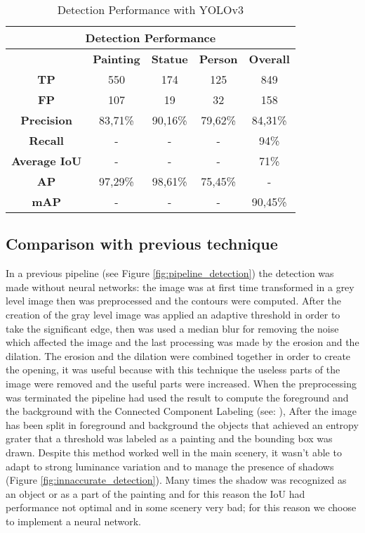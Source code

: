 \begin{table*}[ht]
    \centering
\begin{tabular}{|c|c|c|c|c|}
\hline
\multicolumn{5}{|c|}{\textbf{Detection Performance}}       \\ \hline
\multicolumn{1}{|l|}{} & \textbf{Painting} & \textbf{Statue} & \textbf{Person} & \textbf{Overall} \\ \hline
\textbf{TP}        & 550     & 174     & 125     & 849     \\ \hline
\textbf{FP}        & 107     & 19      & 32      & 158     \\ \hline
\textbf{Precision} & 83,71\% & 90,16\% & 79,62\% & 84,31\% \\ \hline
\textbf{Recall}    & -       & -       & -       & 94\%    \\ \hline
\textbf{Average IoU}       & -       & -       & -       & 71\%    \\ \hline
\textbf{AP}        & 97,29\% & 98,61\% & 75,45\% & -       \\ \hline
\textbf{mAP}       & -       & -       & -       & 90,45\% \\ \hline
\end{tabular}
\caption{Detection Performance with YOLOv3} 
    \label{tab:detection_performance}
\end{table*}



\subsection{Comparison with previous technique}
In a previous pipeline (see Figure \ref{fig:pipeline_detection}) the detection was made without neural networks: the image was at first time transformed in a grey level image then was preprocessed and the contours were computed. After the creation of the gray level image was applied an adaptive threshold in order to take the significant edge, then was used a median blur for removing the noise which affected the image and the last processing was made by the erosion and the dilation.
The erosion and the dilation were combined together in order to create the opening, it was useful because with this technique the useless parts of the image were removed and the useful parts were increased. 
When the preprocessing was terminated the pipeline had used the result to compute the foreground and the background with the Connected Component Labeling (see: \cite{Grana_ccl}),
After the image has been split in foreground and background the objects that achieved an entropy grater that a threshold was labeled as a painting and the bounding box was drawn.
Despite this method worked well in the main scenery, it wasn't able to adapt to strong luminance variation and to manage the presence of shadows (Figure \ref{fig:innaccurate_detection}). Many times the shadow was recognized as an object or as a part of the painting and for this reason the IoU had performance not optimal and in some scenery very bad; for this reason we choose to implement a neural network.


